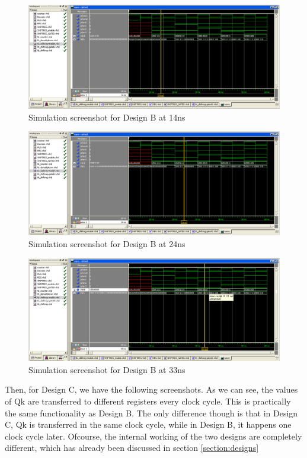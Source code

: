 \documentclass[11pt,a4paper]{article}
\begin{document}
\begin{figure}[htp]
\centering
\includegraphics[length = 4in,width = 6.5in]{./images/simsre1.png}
\caption{Simulation screenshot for Design B at 14ns}
\end{figure}

\begin{figure}[htp]
\centering
\includegraphics[length = 4in,width = 6.5in]{./images/simsre2.png}
\caption{Simulation screenshot for Design B at 24ns}
\end{figure}

\begin{figure}[htp]
\centering
\includegraphics[length = 4in,width = 6.5in]{./images/simsre3.png}
\caption{Simulation screenshot for Design B at 33ns}
\end{figure}

\newpage
Then, for Design C, we have the following screenshots. As we can see, the values of Qk are transferred to different registers every clock cycle. This is practically the same functionality as Design B. The only difference though is that in Design C, Qk is transferred in the same clock cycle, while in Design B, it happens one clock cycle later. Ofcourse, the internal working of the two designs are completely different, which has already been discussed in section \ref{section:designs}
\end{document}

